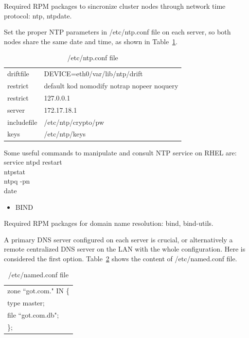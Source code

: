 \documentclass[a4paper, 12pt]{book}
\begin{document}
\noindent Required RPM packages to sincronize cluster nodes through network time protocol: ntp, ntpdate.\bigskip

\noindent Set the proper NTP parameters in /etc/ntp.conf file on each server, so both nodes share the same date and time, as shown in Table~\ref{table:ntp}.

\FloatBarrier
\begin{table}[H]
  \centering
  \begin{tabular}{ | l l | }
    \hline
    driftfile & DEVICE=eth0/var/lib/ntp/drift \\
	restrict & default kod nomodify notrap nopeer noquery \\
    restrict & 127.0.0.1 \\
    server & 172.17.18.1 \\
    includefile & /etc/ntp/crypto/pw \\
    keys & /etc/ntp/keys \\
    \hline
  \end{tabular}
\caption{/etc/ntp.conf file}
\label{table:ntp}
\end{table}


\noindent Some useful commands to manipulate and consult NTP service on RHEL are:\\
\indent service ntpd restart \\
\indent ntpstat \\
\indent ntpq -pn \\
\indent date

\begin{itemize}
	\item BIND
\end{itemize}

\noindent Required RPM packages for domain name resolution: bind, bind-utils.\bigskip

\noindent A primary DNS server configured on each server is crucial, or alternatively a remote centralized DNS server on the LAN with the whole configuration. Here is considered the first option. Table~\ref{table:named} shows the content of /etc/named.conf file.

\FloatBarrier
\begin{table}[H]
  \centering
  \begin{tabular}{ | l | }
    \hline
	  zone ``got.com." IN \{ \\
       type master; \\
       file ``got.com.db"; \\
       \}; \\
    \hline
  \end{tabular}
\caption{/etc/named.conf file}
\label{table:named}
\end{table}
\end{document}
